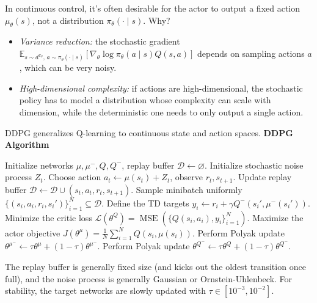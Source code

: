 \documentclass[11pt, letterpaper]{article}
\begin{document}
\begin{concept}
    In continuous control, it's often desirable for the actor to output a fixed action \(\mu_\theta(s)\), not a distribution \(\pi_\theta(\cdot \mid s)\). Why? 
    \begin{itemize}
        \item \textit{Variance reduction:} the stochastic gradient \(\mathbb{E}_{s \sim d^{\pi_\theta}, \, a \sim \pi_\theta(\cdot \mid s)}[\nabla_\theta \log \pi_\theta(a \mid s) Q(s, a)]\) depends on sampling actions \(a\), which can be very noisy. 
        \item \textit{High-dimensional complexity:} if actions are high-dimensional, the stochastic policy has to model a distribution whose complexity can scale with dimension, while the deterministic one needs to only output a single action. 
    \end{itemize}
\end{concept}

\begin{concept}
    DDPG generalizes Q-learning to continuous state and action spaces.
    \algline
    \textbf{DDPG Algorithm}
    \begin{algorithmic}[1]
        \State Initialize networks \(\mu, \mu^-, Q, Q^-\), replay buffer \(\mathcal{D} \gets \varnothing\). 
            \State Initialize stochastic noise process \(Z_t\). 
            \State Choose action \(a_t \gets \mu(s_t) + Z_t\), observe \(r_t, s_{t+1}\). 
            \State Update replay buffer \(\mathcal{D} \gets \mathcal{D} \cup (s_t, a_t, r_t, s_{t+1})\). 
            \State Sample minibatch uniformly \(\{(s_i, a_i, r_i, s_i')\}_{i=1}^N \subseteq \mathcal{D}\). 
            \State Define the TD targets \(y_i \gets r_i + \gamma Q^-(s_i', \mu^-(s_i'))\). 
            \State Minimize the critic loss \(\mathcal{L}(\theta^Q) = \operatorname{MSE}(\{Q(s_i, a_i), y_i\}_{i=1}^N)\). 
            \State Maximize the actor objective \(J(\theta^\mu) = \frac{1}{N} \sum_{i=1}^N Q(s_i, \mu(s_i))\). 
            \State Perform Polyak update \(\theta^{\mu^-} \gets \tau \theta^{\mu} + (1 - \tau) \theta^{\mu^-}\). 
            \State Perform Polyak update \(\theta^{Q^-} \gets \tau \theta^{Q} + (1 - \tau) \theta^{Q^-}\). 
        \EndFor
    \end{algorithmic}
    \algline
    The replay buffer is generally fixed size (and kicks out the oldest transition once full), and the noise process is generally Gaussian or Ornstein-Uhlenbeck. For stability, the target networks are slowly updated with \(\tau \in [10^{-3}, 10^{-2}]\). 
\end{concept}
\end{document}

